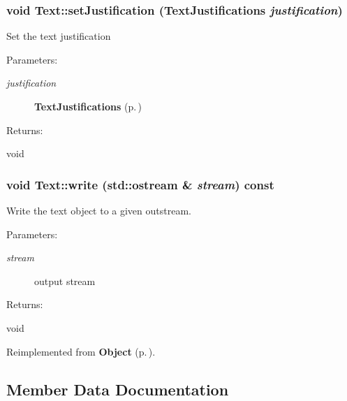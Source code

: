\subsubsection{\setlength{\rightskip}{0pt plus 5cm}void Text::set\-Justification ({\bf Text\-Justifications} {\em justification})\hspace{0.3cm}{\tt  [inline]}}\label{classText_a3}


Set the text justification \begin{Desc}
\item[Parameters: ]\par
\begin{description}
\item[{\em 
justification}]{\bf Text\-Justifications} {\rm (p.\,\pageref{classText_s3})} \end{description}
\end{Desc}
\begin{Desc}
\item[Returns: ]\par
void \end{Desc}
\subsubsection{\setlength{\rightskip}{0pt plus 5cm}void Text::write (std::ostream \& {\em stream}) const\hspace{0.3cm}{\tt  [virtual]}}\label{classText_a5}


Write the text object to a given outstream. \begin{Desc}
\item[Parameters: ]\par
\begin{description}
\item[{\em 
stream}]output stream \end{description}
\end{Desc}
\begin{Desc}
\item[Returns: ]\par
void \end{Desc}


Reimplemented from {\bf Object} {\rm (p.\,\pageref{classObject_a3})}.

\subsection{Member Data Documentation}
